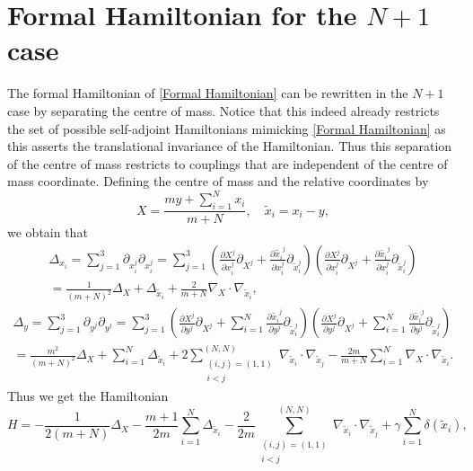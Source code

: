 \documentclass[a4paper,11pt]{article}
\newcommand{\dd}{\partial }
\numberwithin{equation}{section}
\begin{document}
\section{Formal Hamiltonian for the $ N+1 $ case}
The formal Hamiltonian of \eqref{Formal Hamiltonian} can be rewritten in the $ N+1 $ case by separating the centre of mass. Notice that this indeed already restricts the set of possible self-adjoint Hamiltonians mimicking \eqref{Formal Hamiltonian} as this asserts the translational invariance of the Hamiltonian. Thus this separation of the centre of mass restricts to couplings that are independent of the centre of mass coordinate. Defining the centre of mass and the relative coordinates by\begin{equation}
X=\frac{my+\sum_{i=1}^{N}x_i}{m+N}, \quad \tilde{x}_i=x_i-y,
\end{equation}
we obtain that \begin{equation}\begin{aligned}
\Delta_{x_i}=\sum_{j=1}^{3}\dd_{x^j_i}\dd_{x^j_i}=\sum_{j=1}^{3}\left(\frac{\dd X^j}{\dd x^j_{i}}\dd_{X^j}+\frac{\dd \tilde{x_i}^j}{\dd x_i^j}\dd_{\tilde{x}_i^j}\right)\left(\frac{\dd X^j}{\dd x^j_{i}}\dd_{X^j}+\frac{\dd \tilde{x_i}^j}{\dd x_i^j}\dd_{\tilde{x}_i^j}\right)\\
=\frac{1}{(m+N)^2}\Delta_{X}+\Delta_{\tilde{x}_i}+\frac{2}{m+N}\nabla_X\cdot\nabla_{\tilde{x}_i},
\end{aligned}
\end{equation}
\begin{equation}\begin{aligned}
\Delta_{y}=\sum_{j=1}^{3}\dd_{y^j}\dd_{y^j}=\sum_{j=1}^{3}\left(\frac{\dd X^j}{\dd y^j}\dd_{X^j}+\sum_{i=1}^{N}\frac{\dd \tilde{x_i}^j}{\dd y^j}\dd_{\tilde{x}_i^j}\right)\left(\frac{\dd X^j}{\dd y^j}\dd_{X^j}+\sum_{i=1}^{N}\frac{\dd \tilde{x_i}^j}{\dd y^j}\dd_{\tilde{x}_i^j}\right)\\
=\frac{m^2}{(m+N)^2}\Delta_{X}+\sum_{i=1}^{N}\Delta_{\tilde{x}_i}+2\sum_{\substack{(i,j)=(1,1)\\i<j}}^{(N,N)}\nabla_{\tilde{x}_i}\cdot\nabla_{\tilde{x}_j}-\frac{2m}{m+N}\sum_{i=1}^{N}\nabla_X\cdot\nabla_{\tilde{x}_i}.
\end{aligned}
\end{equation}
Thus we get the Hamiltonian \begin{equation}
H=-\frac{1}{2(m+N)}\Delta_X-\frac{m+1}{2m}\sum_{i=1}^{N}\Delta_{\tilde{x}_i}-\frac{2}{2m}\sum_{\substack{(i,j)=(1,1)\\i<j}}^{(N,N)}\nabla_{\tilde{x}_i}\cdot\nabla_{\tilde{x}_j}+\gamma\sum_{i=1}^{N}\delta(\tilde{x}_i),
\end{equation}
\end{document}
